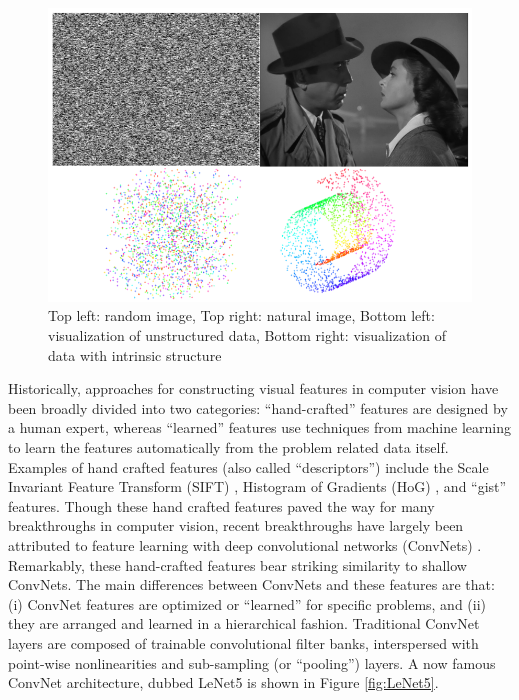 \begin{figure} 
\centering
\includegraphics[scale=0.3]{./figures/introduction/structure.png} 
\caption{Top left: random image, Top right: natural image, Bottom left: visualization of
unstructured data, Bottom right: visualization of data with intrinsic
structure} 
\label{fig:structure} 
\end{figure}  

Historically, approaches for constructing visual features in computer vision
have been broadly divided into two categories: ``hand-crafted'' features are
designed by a human expert, whereas ``learned'' features use techniques from
machine learning to learn the features automatically from the problem related
data itself. Examples of hand crafted features (also called ``descriptors'')
include the Scale Invariant Feature Transform (SIFT) \cite{SIFT}, Histogram of
Gradients (HoG) \cite{HoG}, and ``gist'' \cite{gist} features. Though these
hand crafted features paved the way for many breakthroughs in computer vision,
recent breakthroughs have largely been attributed to feature learning with deep
convolutional networks (ConvNets) \cite{fukushima1980, LeCun1998, ImageNet}.
Remarkably, these hand-crafted features bear striking similarity to shallow
ConvNets. The main differences between ConvNets and these features are that:
(i) ConvNet features are optimized or ``learned'' for specific problems, and
(ii) they are arranged and learned in a hierarchical fashion. Traditional
ConvNet layers are composed of trainable convolutional filter banks,
interspersed with point-wise nonlinearities and sub-sampling (or ``pooling'')
layers.  A now famous ConvNet architecture, dubbed LeNet5 \cite{LeCun1998} is
shown in Figure \ref{fig:LeNet5}.       

